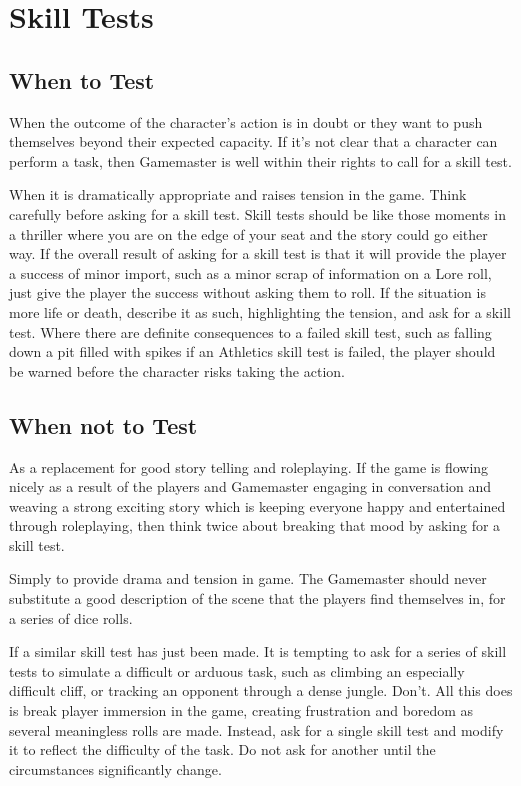 \section{Skill Tests}

\subsection{When to Test}
When the outcome of the character’s action is in doubt or they want to push themselves beyond their expected capacity. If it’s not clear that a character can perform a task, then Gamemaster is well within their rights to call for a skill test.

When it is dramatically appropriate and raises tension in the game. Think carefully before asking for a skill test. Skill tests should be like those moments in a thriller where you are on the edge of your seat and the story could go either way. If the overall result of asking for a skill test is that it will provide the player a success of minor import, such as a minor scrap of information on a Lore roll, just give the player the success without asking them to roll. If the situation is more life or death, describe it as such, highlighting the tension, and ask for a skill test. Where there are definite consequences to a failed skill test, such as falling down a pit filled with spikes if an Athletics skill test is failed, the player should be warned before the character risks taking the action.

\subsection{When not to Test}
As a replacement for good story telling and roleplaying. If the game is flowing nicely as a result of the players and Gamemaster engaging in conversation and weaving a strong exciting story which is keeping everyone happy and entertained through roleplaying, then think twice about breaking that mood by asking for a skill test.

Simply to provide drama and tension in game. The Gamemaster should never substitute a good description of the scene that the players find themselves in, for a series of dice rolls.  

If a similar skill test has just been made. It is tempting to ask for a series of skill tests to simulate a difficult or arduous task, such as climbing an especially difficult cliff, or tracking an opponent through a dense jungle. Don’t. All this does is break player immersion in the game, creating frustration and boredom as several meaningless rolls are made. Instead, ask for a single skill test and modify it to reflect the difficulty of the task. Do not ask for another until the circumstances significantly change.

